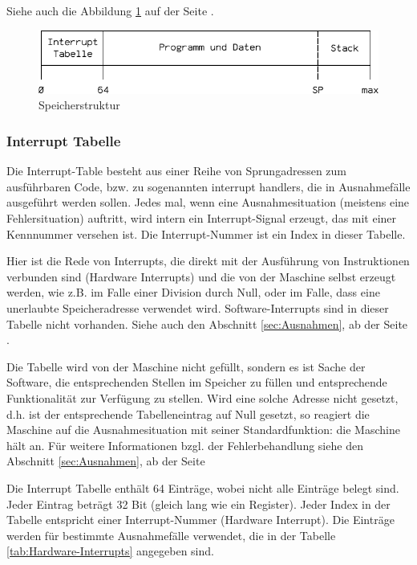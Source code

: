 Siehe auch die Abbildung \ref{fig:Speicherstruktur} auf der Seite
\pageref{fig:Speicherstruktur}.

\begin{figure}[htp]
 \centering
 \includegraphics{./img/UMach-Speicherstruktur}
 \caption{Speicherstruktur}
 \label{fig:Speicherstruktur}
\end{figure}



\subsubsection{Interrupt Tabelle}

Die Interrupt-Table besteht aus einer Reihe von Sprungadressen zum ausführbaren
Code, bzw. zu sogenannten \glqq interrupt handlers\grqq, die in Ausnahmefälle
ausgeführt werden sollen. Jedes mal, wenn eine Ausnahmesituation (meistens eine
Fehlersituation) auftritt, wird intern ein Interrupt-Signal erzeugt, das mit
einer Kennnummer versehen ist. Die Interrupt-Nummer ist ein Index in dieser
Tabelle.

Hier ist die Rede von Interrupts, die direkt mit der Ausführung von
Instruktionen verbunden sind (Hardware Interrupts) und die von der Maschine
selbst erzeugt werden, wie z.B. im Falle einer Division durch Null, oder im
Falle, dass eine unerlaubte Speicheradresse verwendet wird. Software-Interrupts
sind in dieser Tabelle nicht vorhanden. Siehe auch den Abschnitt
\ref{sec:Ausnahmen}, ab der Seite \pageref{sec:Ausnahmen}.


Die Tabelle wird von der Maschine nicht gefüllt, sondern es ist Sache der
Software, die entsprechenden Stellen im Speicher zu füllen und entsprechende
Funktionalität zur Verfügung zu stellen. Wird eine solche Adresse nicht gesetzt,
d.h. ist der entsprechende Tabelleneintrag auf Null gesetzt, so reagiert die
Maschine auf die Ausnahmesituation mit seiner Standardfunktion: die Maschine
hält an. Für weitere Informationen bzgl. der Fehlerbehandlung siehe den
Abschnitt \ref{sec:Ausnahmen}, ab der Seite \pageref{sec:Ausnahmen}

Die Interrupt Tabelle enthält 64 Einträge, wobei nicht alle Einträge belegt
sind. Jeder Eintrag beträgt 32 Bit (gleich lang wie ein Register). Jeder Index
in der Tabelle entspricht einer Interrupt-Nummer (Hardware Interrupt). Die
Einträge werden für bestimmte Ausnahmefälle verwendet, die in der Tabelle
\ref{tab:Hardware-Interrupts} angegeben sind. 


